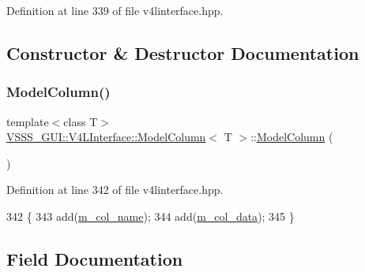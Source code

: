 Definition at line 339 of file v4linterface.\+hpp.



\subsection{Constructor \& Destructor Documentation}
\mbox{\label{class_v_s_s_s___g_u_i_1_1_v4_l_interface_1_1_model_column_a4854fcf5e2e9a5c6946e076e6a757bd2}} 
\subsubsection{\texorpdfstring{Model\+Column()}{ModelColumn()}}
{\footnotesize\ttfamily template$<$class T$>$ \\
\hyperlink{class_v_s_s_s___g_u_i_1_1_v4_l_interface_1_1_model_column}{V\+S\+S\+S\+\_\+\+G\+U\+I\+::\+V4\+L\+Interface\+::\+Model\+Column}$<$ T $>$\+::\hyperlink{class_v_s_s_s___g_u_i_1_1_v4_l_interface_1_1_model_column}{Model\+Column} (\begin{DoxyParamCaption}{ }\end{DoxyParamCaption})\hspace{0.3cm}{\ttfamily [inline]}}



Definition at line 342 of file v4linterface.\+hpp.


\begin{DoxyCode}
342                           \{
343                 add(\hyperlink{class_v_s_s_s___g_u_i_1_1_v4_l_interface_1_1_model_column_a96d5f652d19a139a1380d9ffc0110ed0}{m\_col\_name});
344                 add(\hyperlink{class_v_s_s_s___g_u_i_1_1_v4_l_interface_1_1_model_column_aa6720e1b3e47adb85d36c3ec3a2bb262}{m\_col\_data});
345             \}
\end{DoxyCode}


\subsection{Field Documentation}
\mbox{\label{class_v_s_s_s___g_u_i_1_1_v4_l_interface_1_1_model_column_aa6720e1b3e47adb85d36c3ec3a2bb262}} 

